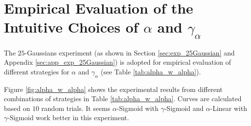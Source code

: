 \documentclass[letterpaper]{article} %
\begin{document}
\section{Empirical Evaluation of the Intuitive Choices of $\alpha$ and $\gamma_{\alpha}$}
\label{sec:alpha_w_alpha}



The $25$-Gaussians experiment (as shown in Section \ref{sec:exp_25Gaussian} and Appendix \ref{sec:app_exp_25Gaussian}) is adopted for empirical evaluation of different strategies for $\alpha$ and $\gamma_{\alpha}$ (see Table \ref{tab:alpha_w_alpha}).

\begin{table}[H]\centering
	\caption{Tested strategies for $\alpha$ and $\gamma_{\alpha}$.
		$t \in [0^{+}, 1^{-}]$ linearly corresponds to the iteration ${iter} \in [1,2,\cdots, {NumIters}]$; for example, $t = \epsilon + ({iter}-1) \frac{1-2\epsilon}{{NumIters}-1}$. ${NumIters}$ is the total number of iterations and $\epsilon$ is a small positive number.
		$a=c=20, b=d=-10$ in this experiment.
	}\label{tab:alpha_w_alpha}
\end{table}


Figure \ref{fig:alpha_w_alpha} shows the experimental results from different combinations of strategies in Table \ref{tab:alpha_w_alpha}. Curves are calculated based on $10$ random trials. It seems $\alpha$-Sigmoid with $\gamma$-{Sigmoid} and $\alpha$-Linear with $\gamma$-{Sigmoid} work better in this experiment.
 
\end{document}

